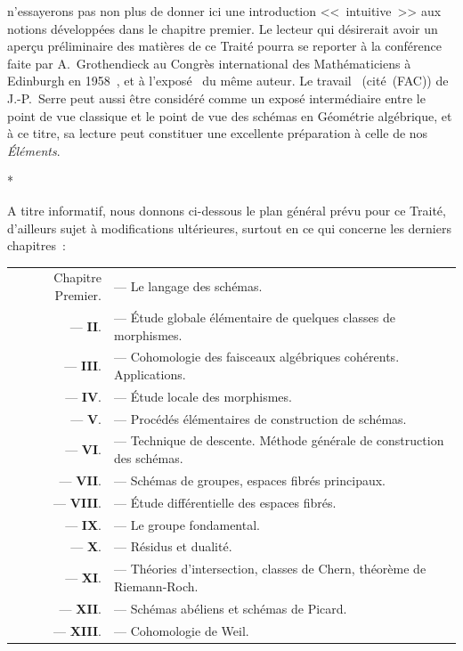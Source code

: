 n'essayerons pas non plus de donner ici une introduction <<~intuitive~>> aux notions développées dans le chapitre premier.
Le lecteur qui désirerait avoir un aperçu préliminaire des matières de ce Traité pourra se reporter à la conférence faite par A.~Grothendieck au Congrès international des Mathématiciens à Edinburgh en 1958~\cite{I-7}, et à l'exposé~\cite{I-8} du même auteur.
Le travail~\cite{I-14} (cité~(FAC)) de J.-P.~Serre peut aussi être considéré comme un exposé intermédiaire entre le point de vue classique et le point de vue des schémas en Géométrie algébrique, et à ce titre, sa lecture peut constituer une excellente préparation à celle de nos \emph{Éléments}.

\bigskip
\begin{center}*\quad*\quad*\end{center}
\bigskip

A titre informatif, nous donnons ci-dessous le plan général prévu pour ce Traité, d'ailleurs sujet à modifications ultérieures, surtout en ce qui concerne les derniers chapitres~:

\medskip
\begin{tabular}{rl}
  Chapitre Premier. & --- Le langage des schémas.\\
  --- \textbf{II}. & --- Étude globale élémentaire de quelques classes de morphismes.\\
  --- \textbf{III}. & --- Cohomologie des faisceaux algébriques cohérents. Applications.\\
  --- \textbf{IV}. & --- Étude locale des morphismes.\\
  --- \textbf{V}. & --- Procédés élémentaires de construction de schémas.\\
  --- \textbf{VI}. & --- Technique de descente. Méthode générale de construction des schémas.\\
  --- \textbf{VII}. & --- Schémas de groupes, espaces fibrés principaux.\\
  --- \textbf{VIII}. & --- Étude différentielle des espaces fibrés.\\
  --- \textbf{IX}. & --- Le groupe fondamental.\\
  --- \textbf{X}. & --- Résidus et dualité.\\
  --- \textbf{XI}. & --- Théories d'intersection, classes de Chern, théorème de Riemann-Roch.\\
  --- \textbf{XII}. & --- Schémas abéliens et schémas de Picard.\\
  --- \textbf{XIII}. & --- Cohomologie de Weil.\\
\end{tabular}
\medskip

